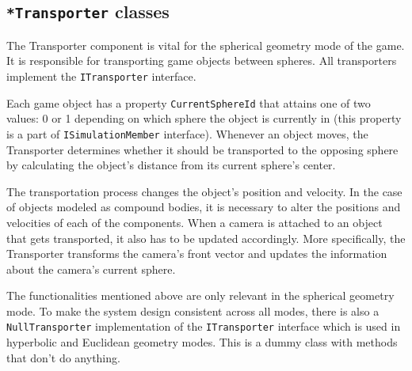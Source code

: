 \subsection{\texttt{*Transporter} classes} \label{subsec:transporter-classes}
The Transporter component is vital for the spherical geometry mode of the game.
It is responsible for transporting game objects between spheres.
All transporters implement the \texttt{ITransporter} interface.

Each game object has a property \texttt{CurrentSphereId} that attains one of two values: 0 or 1 depending on which sphere the object is currently in (this property is a part of \texttt{ISimulationMember} interface).
Whenever an object moves, the Transporter determines whether it should be transported to the opposing sphere by calculating the object's distance from its current sphere's center.

The transportation process changes the object's position and velocity.
In the case of objects modeled as compound bodies, it is necessary to alter the positions and velocities of each of the components.
When a camera is attached to an object that gets transported, it also has to be updated accordingly.
More specifically, the Transporter transforms the camera's front vector and updates the information about the camera's current sphere.

The functionalities mentioned above are only relevant in the spherical geometry mode.
To make the system design consistent across all modes, there is also a \texttt{NullTransporter} implementation of the \texttt{ITransporter} interface which is used in hyperbolic and Euclidean geometry modes.
This is a dummy class with methods that don't do anything.